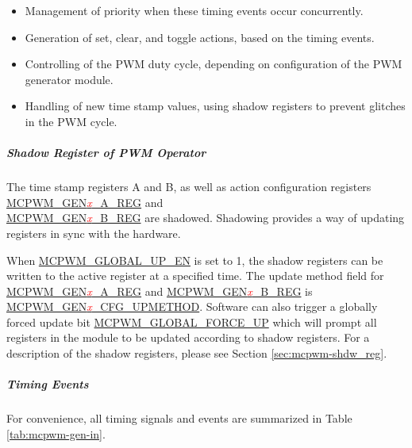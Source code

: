 \documentclass[main\_\_EN.tex]{subfiles}
\begin{document}
\begin{itemize}
\begin{itemize}
        \item DT1: the PWM timer is counting down and FAULT0 detected(field \hyperref[fielddesc:MCPWMGEN0T0SEL]{MCPWM\_GEN\textcolor{red}{\it{x}}\_T1\_SEL} is set to 0) or FAULT1 detected (field \hyperref[fielddesc:MCPWMGEN0T0SEL]{MCPWM\_GEN\textcolor{red}{\it{x}}\_T1\_SEL} is set to 1) or FAULT2 detected (field \hyperref[fielddesc:MCPWMGEN0T0SEL]{MCPWM\_GEN\textcolor{red}{\it{x}}\_T1\_SEL} is set to 2) or synchronized (field \hyperref[fielddesc:MCPWMGEN0T0SEL]{MCPWM\_GEN\textcolor{red}{\it{x}}\_T1\_SEL} is set to 3).
    \end{itemize}
    \item Management of priority when these timing events occur concurrently.
    \item Generation of set, clear, and toggle actions, based on the timing events.
    \item Controlling of the PWM duty cycle, depending on configuration of the PWM generator module.
    \item Handling of new time stamp values, using shadow registers to prevent glitches in the PWM cycle.
\end{itemize}

\subparagraph{Shadow Register of PWM Operator}
The time stamp registers A and B, as well as action configuration registers  \hyperref[regdesc:MCPWMGEN0AREG]{MCPWM\_GEN\textcolor{red}{\it{x}}\_A\_REG} and\\ \hyperref[regdesc:MCPWMGEN0BREG]{MCPWM\_GEN\textcolor{red}{\it{x}}\_B\_REG} are shadowed. Shadowing provides a way of updating registers in sync with the hardware. 

When \hyperref[fielddesc:MCPWMGLOBALUPEN]{MCPWM\_GLOBAL\_UP\_EN} is set to 1, the shadow registers can be written to the active register at a specified time. The update method field for \hyperref[regdesc:MCPWMGEN0AREG]{MCPWM\_GEN\textcolor{red}{\it{x}}\_A\_REG} and \hyperref[regdesc:MCPWMGEN0BREG]{MCPWM\_GEN\textcolor{red}{\it{x}}\_B\_REG} is \hyperref[fielddesc:MCPWMGEN0CFGUPMETHOD]{MCPWM\_GEN\textcolor{red}{\it{x}}\_CFG\_UPMETHOD}. Software can also trigger a globally forced update bit \hyperref[fielddesc:MCPWMGLOBALFORCEUP]{MCPWM\_GLOBAL\_FORCE\_UP} which will prompt all registers in the module to be updated according to shadow registers. For a description of the shadow registers, please see Section \ref{sec:mcpwm-shdw_reg}.

\subparagraph{Timing Events}
For convenience, all timing signals and events are summarized in Table \ref{tab:mcpwm-gen-in}.

\end{document}

